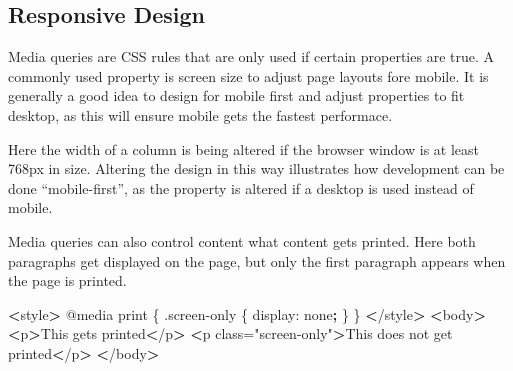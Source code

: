 \documentclass[]{book}
\newenvironment{Shaded}{\begin{snugshade}}{\end{snugshade}}
\newcommand{\KeywordTok}[1]{\textcolor[rgb]{0.13,0.29,0.53}{\textbf{#1}}}
\newcommand{\StringTok}[1]{\textcolor[rgb]{0.31,0.60,0.02}{#1}}
\newcommand{\OperatorTok}[1]{\textcolor[rgb]{0.81,0.36,0.00}{\textbf{#1}}}
\newcommand{\ExtensionTok}[1]{#1}
\newcommand{\NormalTok}[1]{#1}
\begin{document}
\subsection{Responsive Design}\label{responsive-design}

Media queries are CSS rules that are only used if certain properties are
true. A commonly used property is screen size to adjust page layouts
fore mobile. It is generally a good idea to design for mobile first and
adjust properties to fit desktop, as this will ensure mobile gets the
fastest performace.

Here the width of a column is being altered if the browser window is at
least 768px in size. Altering the design in this way illustrates how
development can be done ``mobile-first'', as the property is altered if
a desktop is used instead of mobile.

\begin{Shaded}
\end{Shaded}

Media queries can also control content what content gets printed. Here
both paragraphs get displayed on the page, but only the first paragraph
appears when the page is printed.

\begin{Shaded}
\begin{Highlighting}[]
\OperatorTok{<}\ExtensionTok{style}\OperatorTok{>}
    \ExtensionTok{@media}\NormalTok{ print \{}
        \ExtensionTok{.screen-only}\NormalTok{ \{}
            \ExtensionTok{display}\NormalTok{: none}\KeywordTok{;}
\NormalTok{        \}}
\NormalTok{    \}}
\OperatorTok{<}\NormalTok{/}\ExtensionTok{style}\OperatorTok{>}
\OperatorTok{<}\ExtensionTok{body}\OperatorTok{>}
    \OperatorTok{<}\ExtensionTok{p}\OperatorTok{>}\NormalTok{This gets printed}\OperatorTok{<}\NormalTok{/p}\OperatorTok{>}
    \OperatorTok{<}\ExtensionTok{p}\NormalTok{ class=}\StringTok{"screen-only"}\OperatorTok{>}\NormalTok{This does not get printed}\OperatorTok{<}\NormalTok{/p}\OperatorTok{>}
\OperatorTok{<}\NormalTok{/}\ExtensionTok{body}\OperatorTok{>}
\end{Highlighting}
\end{Shaded}
\end{document}
